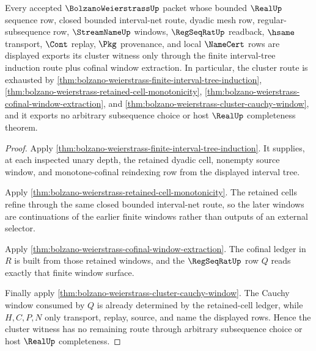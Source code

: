 \begin{theorem}
\label{thm:bolzano-weierstrass-finite-interval-subsequence-exhaustion}
Every accepted $\BolzanoWeierstrassUp$ packet whose bounded $\RealUp$ sequence row, closed bounded interval-net route, dyadic mesh row, regular-subsequence row, $\StreamNameUp$ windows, $\RegSeqRatUp$ readback, $\hsame$ transport, $\Cont$ replay, $\Pkg$ provenance, and local $\NameCert$ rows are displayed exports its cluster witness only through the finite interval-tree induction route plus cofinal window extraction. In particular, the cluster route is exhausted by \autoref{thm:bolzano-weierstrass-finite-interval-tree-induction}, \autoref{thm:bolzano-weierstrass-retained-cell-monotonicity}, \autoref{thm:bolzano-weierstrass-cofinal-window-extraction}, and \autoref{thm:bolzano-weierstrass-cluster-cauchy-window}, and it exports no arbitrary subsequence choice or host $\RealUp$ completeness theorem.
\end{theorem}
\begin{proof}
Apply \autoref{thm:bolzano-weierstrass-finite-interval-tree-induction}. It supplies, at each inspected unary depth, the retained dyadic cell, nonempty source window, and monotone-cofinal reindexing row from the displayed interval tree.

Apply \autoref{thm:bolzano-weierstrass-retained-cell-monotonicity}. The retained cells refine through the same closed bounded interval-net route, so the later windows are continuations of the earlier finite windows rather than outputs of an external selector.

Apply \autoref{thm:bolzano-weierstrass-cofinal-window-extraction}. The cofinal ledger in $R$ is built from those retained windows, and the $\RegSeqRatUp$ row $Q$ reads exactly that finite window surface.

Finally apply \autoref{thm:bolzano-weierstrass-cluster-cauchy-window}. The Cauchy window consumed by $Q$ is already determined by the retained-cell ledger, while $H,C,P,N$ only transport, replay, source, and name the displayed rows. Hence the cluster witness has no remaining route through arbitrary subsequence choice or host $\RealUp$ completeness.
\end{proof}

